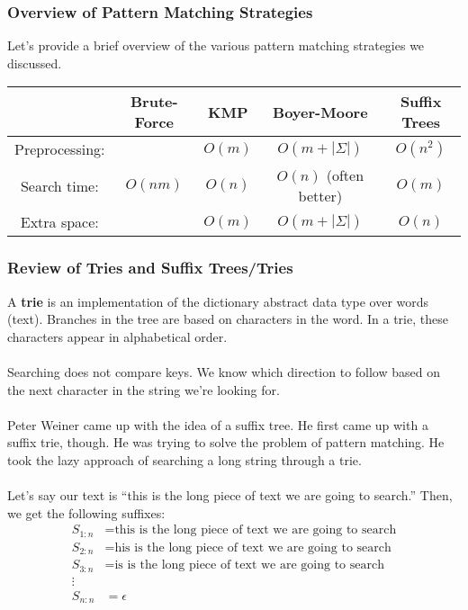 \documentclass[]{article}
\theoremstyle{definition}
\newcommand{\lecture}[1]{\marginpar{{\footnotesize $\leftarrow$ \underline{#1}}}}
\begin{document}
			\subsubsection{Overview of Pattern Matching Strategies}
				Let's provide a brief overview of the various pattern matching strategies we discussed.

				\begin{center}
					\begin{tabular}{|c||c|c|c|c|}
						\hline
						& Brute-Force & KMP & Boyer-Moore & Suffix Trees \\ \hline
						Preprocessing: & & $O(m)$ & $O(m + |\Sigma|)$ & $O(n^2)$ \\
						Search time: & $O(nm)$ & $O(n)$ & $O(n)$ (often better) & $O(m)$ \\
						Extra space: & & $O(m)$ & $O(m + |\Sigma|)$ & $O(n)$ \\ \hline
					\end{tabular}
				\end{center}

			\subsubsection{Review of Tries and Suffix Trees/Tries} \lecture{March 26, 2013}
				A \textbf{trie} is an implementation of the dictionary abstract data type over words (text). Branches in the tree are based on characters in the word. In a trie, these characters appear in alphabetical order.
				\\ \\
				Searching does not compare keys. We know which direction to follow based on the next character in the string we're looking for.
				\\ \\
				Peter Weiner came up with the idea of a suffix tree. He first came up with a suffix trie, though. He was trying to solve the problem of pattern matching. He took the lazy approach of searching a long string through a trie.
				\\ \\
				Let's say our text is ``this is the long piece of text we are going to search.'' Then, we get the following suffixes:
				\begin{align*}
					S_{1:n} &= \text{this is the long piece of text we are going to search} \\
					S_{2:n} &= \text{his is the long piece of text we are going to search} \\
					S_{3:n} &= \text{is is the long piece of text we are going to search} \\
					\vdots& \\
					S_{n:n} &= \epsilon
				\end{align*}
				
\end{document}
